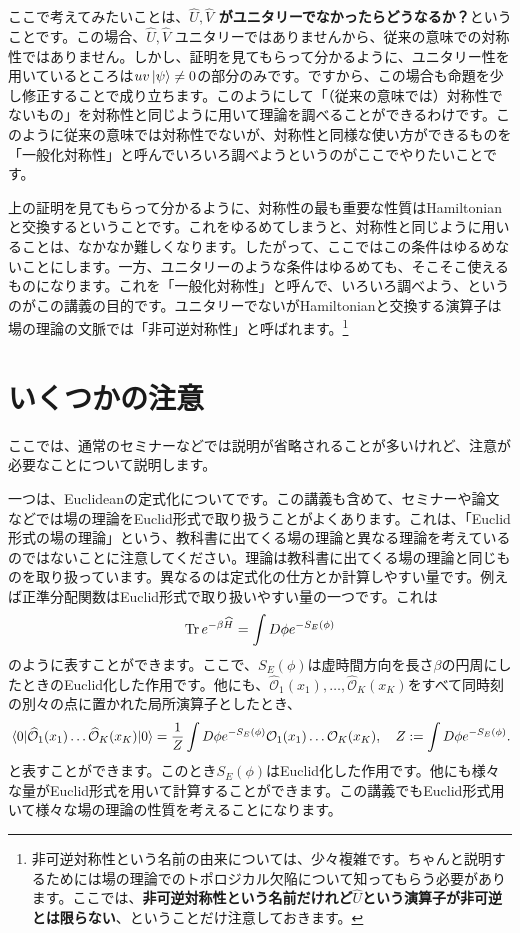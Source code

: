 \documentclass[report,paper=a4, fontsize=12pt, line_length=16cm, number_of_lines=33,dvipdfmx]{jlreq}
\newcommand{\kyou}[1]{{\sffamily \bfseries #1}}
\numberwithin{equation}{chapter}
\newcommand{\Hh}{\widehat{H}}
\newcommand{\Uh}{\widehat{U}}
\newcommand{\Vh}{\widehat{V}}
\newcommand{\Ocal}{\mathcal{O}}
\newcommand{\Ocalh}{\widehat{\mathcal{O}}}
\begin{document}
ここで考えてみたいことは、\kyou{$\Uh,\Vh$ がユニタリーでなかったらどうなるか？}ということです。この場合、$\Uh,\Vh$ ユニタリーではありませんから、従来の意味での対称性ではありません。しかし、証明を見てもらって分かるように、ユニタリー性を用いているところは$uv\ket{\psi}\ne 0$の部分のみです。ですから、この場合も命題を少し修正することで成り立ちます。このようにして「（従来の意味では）対称性でないもの」を対称性と同じように用いて理論を調べることができるわけです。このように従来の意味では対称性でないが、対称性と同様な使い方ができるものを「一般化対称性」と呼んでいろいろ調べようというのがここでやりたいことです。

上の証明を見てもらって分かるように、対称性の最も重要な性質はHamiltonianと交換するということです。これをゆるめてしまうと、対称性と同じように用いることは、なかなか難しくなります。したがって、ここではこの条件はゆるめないことにします。一方、ユニタリーのような条件はゆるめても、そこそこ使えるものになります。これを「一般化対称性」と呼んで、いろいろ調べよう、というのがこの講義の目的です。ユニタリーでないがHamiltonianと交換する演算子は場の理論の文脈では「非可逆対称性」と呼ばれます。\footnote{非可逆対称性という名前の由来については、少々複雑です。ちゃんと説明するためには場の理論でのトポロジカル欠陥について知ってもらう必要があります。ここでは、\kyou{非可逆対称性という名前だけれど$\Uh$という演算子が非可逆とは限らない}、ということだけ注意しておきます。}

\section{いくつかの注意}\label{sec:remarks}
ここでは、通常のセミナーなどでは説明が省略されることが多いけれど、注意が必要なことについて説明します。

一つは、Euclideanの定式化についてです。この講義も含めて、セミナーや論文などでは場の理論をEuclid形式で取り扱うことがよくあります。これは、「Euclid形式の場の理論」という、教科書に出てくる場の理論と異なる理論を考えているのではないことに注意してください。理論は教科書に出てくる場の理論と同じものを取り扱っています。異なるのは定式化の仕方とか計算しやすい量です。例えば正準分配関数はEuclid形式で取り扱いやすい量の一つです。これは
\begin{align}
  \Tr e^{-\beta \Hh} = \int D\phi e^{-S_{E}(\phi)}
\end{align}
のように表すことができます。ここで、$S_{E}(\phi)$は虚時間方向を長さ$\beta$の円周にしたときのEuclid化した作用です。他にも、$\Ocalh_1(x_1),\dots, \Ocalh_K(x_K)$をすべて同時刻の別々の点に置かれた局所演算子としたとき、
\begin{align}
  \expval{\Ocalh_1(x_1) \dots \Ocalh_K(x_K)}{0}
  =\frac{1}{Z}\int D\phi e^{-S_{E}(\phi)} \Ocal_1(x_1) \dots \Ocal_K(x_K),\quad 
  Z:=\int D\phi e^{-S_{E}(\phi)}.
\end{align}
と表すことができます。このとき$S_E(\phi)$はEuclid化した作用です。他にも様々な量がEuclid形式を用いて計算することができます。この講義でもEuclid形式用いて様々な場の理論の性質を考えることになります。
\end{document}
